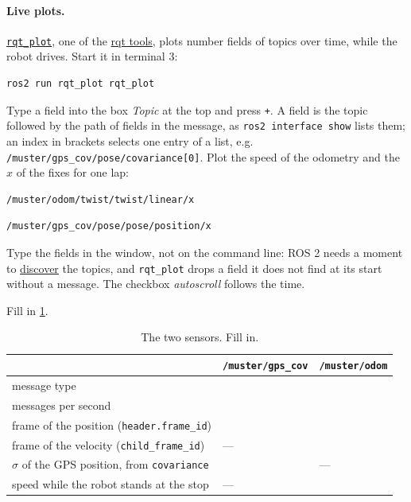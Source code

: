 \documentclass[11pt,a4paper,parskip=half]{scrartcl}
\newcommand{\thema}[1]{\texttt{#1}}
\begin{document}
\paragraph{Live plots.} \href{https://github.com/ros-visualization/rqt_plot}{\thema{rqt\_plot}}, one of the
\href{https://docs.ros.org/en/jazzy/Concepts/Intermediate/About-RQt.html}{rqt tools}, plots number fields of
topics over time, while the robot drives. Start it in terminal 3:
\begin{lstlisting}
ros2 run rqt_plot rqt_plot
\end{lstlisting}
Type a field into the box \emph{Topic} at the top and press \thema{+}. A field is the topic followed by the path
of fields in the message, as \thema{ros2 interface show} lists them; an index in brackets selects one entry of a
list, e.g. \thema{/muster/gps\_cov/pose/covariance[0]}. Plot the speed of the odometry and the \(x\) of the fixes
for one lap:
\begin{lstlisting}
/muster/odom/twist/twist/linear/x
\end{lstlisting}
\begin{lstlisting}
/muster/gps_cov/pose/pose/position/x
\end{lstlisting}
Type the fields in the window, not on the command line: ROS 2 needs a moment to
\href{https://docs.ros.org/en/jazzy/Concepts/Basic/About-Discovery.html}{discover} the topics, and
\thema{rqt\_plot} drops a field it does not find at its start without a message. The checkbox \emph{autoscroll}
follows the time.

Fill in \cref{tab:sensors}.

\begin{table}[ht]\centering
\renewcommand{\arraystretch}{1.5}
\caption{The two sensors. Fill in.}
\label{tab:sensors}
\begin{tabular}{@{}>{\raggedright\arraybackslash}p{6.0cm}p{3.6cm}p{3.6cm}@{}}
\toprule
& \thema{/muster/gps\_cov} & \thema{/muster/odom} \\
\midrule
message type & & \\
messages per second & & \\
frame of the position (\thema{header.frame\_id}) & & \\
frame of the velocity (\thema{child\_frame\_id}) & --- & \\
\(\sigma\) of the GPS position, from \thema{covariance} & & --- \\
speed while the robot stands at the stop & --- & \\
\bottomrule
\end{tabular}
\end{table}
\end{document}
